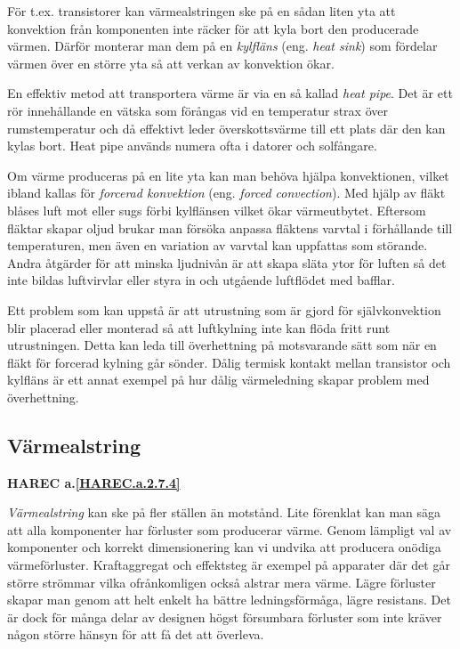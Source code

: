 För t.ex. transistorer kan värmealstringen ske på en sådan liten yta att
konvektion från komponenten inte räcker för att kyla bort den producerade
värmen. Därför monterar man dem på en \emph{kylfläns} (eng.
\emph{heat sink}) som fördelar värmen över en större yta så att verkan av
konvektion ökar.

En effektiv metod att transportera värme är via en så kallad \emph{heat pipe}.
Det är ett rör innehållande en vätska som förångas vid en temperatur strax över
rumstemperatur och då effektivt leder överskottsvärme till ett plats där den kan
kylas bort. Heat pipe används numera ofta i datorer och solfångare.

Om värme produceras på en lite yta kan man behöva hjälpa konvektionen, vilket
ibland kallas för \emph{forcerad konvektion} (eng. \emph{forced convection}).
Med hjälp av fläkt blåses luft mot eller sugs förbi kylflänsen vilket ökar
värmeutbytet. Eftersom fläktar skapar oljud brukar man försöka anpassa
fläktens varvtal i förhållande till temperaturen, men även en variation av
varvtal kan uppfattas som störande. Andra åtgärder för att minska ljudnivån
är att skapa släta ytor för luften så det inte bildas luftvirvlar eller
styra in och utgående luftflödet med bafflar.

Ett problem som kan uppstå är att utrustning som är gjord för självkonvektion
blir placerad eller monterad så att luftkylning inte kan flöda fritt runt
utrustningen. Detta kan leda till överhettning på motsvarande sätt som när
en fläkt för forcerad kylning går sönder. Dålig termisk kontakt mellan
transistor och kylfläns är ett annat exempel på hur dålig värmeledning skapar
problem med överhettning.

\subsection{Värmealstring}
\textbf{
HAREC a.\ref{HAREC.a.2.7.4}\label{myHAREC.a.2.7.4}
}

\emph{Värmealstring} kan ske på fler ställen än motstånd. Lite förenklat
kan man säga att alla komponenter har förluster som producerar värme. Genom
lämpligt val av komponenter och korrekt dimensionering kan vi undvika att
producera onödiga värmeförluster. Kraftaggregat och effektsteg är exempel
på apparater där det går större strömmar vilka ofrånkomligen också alstrar
mera värme. Lägre förluster skapar man genom att helt enkelt ha bättre
ledningsförmåga, lägre resistans. Det är dock för många delar av designen
högst försumbara förluster som inte kräver någon större hänsyn för att få
det att överleva.

